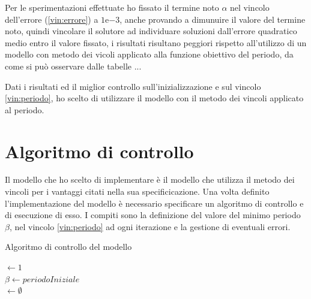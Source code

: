 \documentclass[a4paper,12pt]{report}
\newcommand{\expnumber}[2]{{#1}\mathrm{e}{#2}}
\begin{document}
Per le sperimentazioni effettuate  ho fissato il termine noto $\alpha$ nel vincolo dell'errore (\ref{vin:errore}) a $\expnumber{1}{-3}$, anche provando a dimunuire il valore del termine noto, quindi vincolare il solutore ad individuare soluzioni dall'errore quadratico medio entro il valore fissato, i risultati risultano peggiori rispetto all'utilizzo di un modello con metodo dei vicoli applicato alla funzione obiettivo del periodo, da come si può osservare dalle tabelle ...

Dati i risultati ed il miglior controllo sull'inizializzazione e sul vincolo \ref{vin:periodo}, ho scelto di utilizzare il modello con il metodo dei vincoli applicato al periodo.



\section{Algoritmo di controllo}
\label{ss:controllo}
Il modello che ho scelto di implementare è il modello che utilizza il metodo dei vincoli per i vantaggi citati nella sua specificicazione. Una volta definito l'implementazione del modello è necessario specificare un algoritmo di controllo e di esecuzione di esso. I compiti sono la definizione del valore del minimo periodo $ \beta $, nel vincolo \eqref{vin:periodo} ad ogni iterazione e la gestione di eventuali errori.

\begin{algorithm}
  \caption{Algoritmo di controllo del modello}
  \label{controllo}

  \BlankLine
  \BlankLine

  \Passo $\leftarrow 1$ \\
  $\beta \leftarrow periodoIniziale$ \\
  \Soluzioni $\leftarrow \emptyset$ \\


\end{algorithm}
\end{document}
